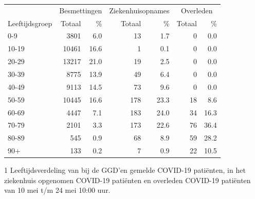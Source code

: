 \documentclass[
  english,
  man,floatsintext]{apa6}
\begin{document}
\begin{table}
\centering\begingroup\fontsize{11}{13}\selectfont

\begin{threeparttable}
\begin{tabular}{lrrrrrr}
\toprule
\multicolumn{1}{c}{ } & \multicolumn{2}{c}{Besmettingen} & \multicolumn{2}{c}{Ziekenhuisopnames} & \multicolumn{2}{c}{Overleden} \\
\cmidrule(l{3pt}r{3pt}){2-3} \cmidrule(l{3pt}r{3pt}){4-5} \cmidrule(l{3pt}r{3pt}){6-7}
Leeftijdsgroep & Totaal & \% & Totaal & \% & Totaal & \%\\
\midrule
0-9 & 3801 & 6.0 & 13 & 1.7 & 0 & 0.0\\
10-19 & 10461 & 16.6 & 1 & 0.1 & 0 & 0.0\\
20-29 & 13217 & 21.0 & 19 & 2.5 & 0 & 0.0\\
30-39 & 8775 & 13.9 & 49 & 6.4 & 0 & 0.0\\
40-49 & 9113 & 14.5 & 73 & 9.6 & 0 & 0.0\\
50-59 & 10445 & 16.6 & 178 & 23.3 & 18 & 8.6\\
60-69 & 4447 & 7.1 & 183 & 24.0 & 34 & 16.3\\
70-79 & 2101 & 3.3 & 173 & 22.6 & 76 & 36.4\\
80-89 & 545 & 0.9 & 68 & 8.9 & 59 & 28.2\\
90+ & 133 & 0.2 & 7 & 0.9 & 22 & 10.5\\
\bottomrule
\end{tabular}
\begin{tablenotes}
\item[1] Leeftijdsverdeling van bij de GGD’en gemelde COVID-19 patiënten, in het ziekenhuis opgenomen COVID-19 patiënten en overleden COVID-19 patiënten van 10 mei t/m 24 mei 10:00 uur.
\end{tablenotes}
\end{threeparttable}
\endgroup{}
\end{table}

\newpage
\end{document}
